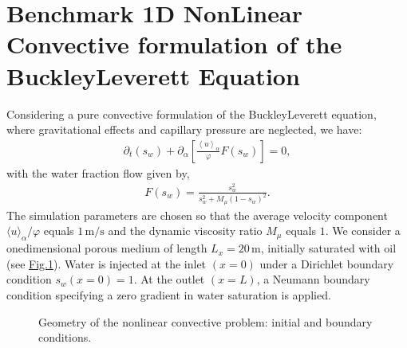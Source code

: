 \documentclass[letterpaper,10pt,english,openany,oneside]{jupyterBook}
\begin{document}
\section{Benchmark \sphinxhyphen{} 1D Non\sphinxhyphen{}Linear Convective formulation of the Buckley\sphinxhyphen{}Leverett Equation}
\label{\detokenize{LBM-Study/Convective-Equation:benchmark-1d-non-linear-convective-formulation-of-the-buckley-leverett-equation}}
\sphinxAtStartPar
Considering a pure convective formulation of the Buckley\sphinxhyphen{}Leverett equation, where gravitational effects and capillary pressure are neglected, we have:
\begin{equation}\label{equation:LBM-Study/Convective-Equation:EqMassMTP-BL-Sim}
\begin{split}
\partial_{t} (s_{w})+ \partial_{\alpha}\left[\displaystyle\frac{\left<u\right>_{\alpha}}{\varphi} F(s_w)\right] = 0 ,
\end{split}
\end{equation}
\sphinxAtStartPar
with the water fraction flow given by,
\begin{equation}\label{equation:LBM-Study/Convective-Equation:EqFractionalFlow}
\begin{split}
F(s_w) = \frac{ s_{w}^{2} }{ s_{w}^{2} + M_{\mu}(1-s_{w})^{2}}.
\end{split}
\end{equation}
\sphinxAtStartPar
The simulation parameters are chosen so that the average velocity component \(\langle u \rangle_{\alpha} / \varphi\) equals \(1\,\mathrm{m/s}\) and the dynamic viscosity ratio \(M_{\mu}\) equals \(1\). We consider a one\sphinxhyphen{}dimensional porous medium of length \(L_x = 20\,\mathrm{m}\), initially saturated with oil (see \hyperref[\detokenize{LBM-Study/Convective-Equation:d-displace-bl}]{Fig.\@ \ref{\detokenize{LBM-Study/Convective-Equation:d-displace-bl}}}). Water is injected at the inlet \((x=0)\) under a Dirichlet boundary condition \(s_{w}(x=0)=1\). At the outlet \((x=L)\), a Neumann boundary condition specifying a zero gradient in water saturation is applied.

\begin{figure}[htbp]
\centering
\capstart

\noindent{}
\caption{Geometry of the non\sphinxhyphen{}linear convective problem: initial and boundary conditions.}\label{\detokenize{LBM-Study/Convective-Equation:d-displace-bl}}\end{figure}
\end{document}
